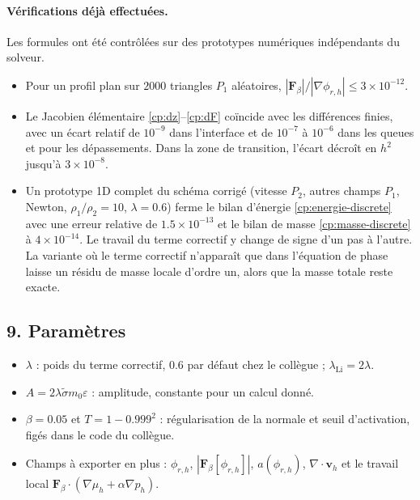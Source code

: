 \paragraph{Vérifications déjà effectuées.} Les formules ont été contrôlées sur des prototypes numériques indépendants du solveur.
\begin{itemize}
  \item Pour un profil plan sur $2000$ triangles $P_1$ aléatoires, $|\mathbf{F}_\beta|/|\nabla\phi_{r,h}|\le 3\times10^{-12}$.
  \item Le Jacobien élémentaire \eqref{cp:dz}--\eqref{cp:dF} coïncide avec les différences finies, avec un écart relatif de $10^{-9}$ dans l'interface et de $10^{-7}$ à $10^{-6}$ dans les queues et pour les dépassements. Dans la zone de transition, l'écart décroît en $h^{2}$ jusqu'à $3\times10^{-8}$.
  \item Un prototype 1D complet du schéma corrigé (vitesse $P_2$, autres champs $P_1$, Newton, $\rho_1/\rho_2=10$, $\lambda=0.6$) ferme le bilan d'énergie \eqref{cp:energie-discrete} avec une erreur relative de $1.5\times10^{-13}$ et le bilan de masse \eqref{cp:masse-discrete} à $4\times10^{-14}$. Le travail du terme correctif y change de signe d'un pas à l'autre. La variante où le terme correctif n'apparaît que dans l'équation de phase laisse un résidu de masse locale d'ordre un, alors que la masse totale reste exacte.
\end{itemize}

\subsection*{9. Paramètres}

\begin{itemize}
  \item $\lambda$ : poids du terme correctif, $0.6$ par défaut chez le collègue ; $\lambda_{\mathrm{Li}}=2\lambda$.
  \item $A = 2\lambda\tilde{\sigma}m_0\varepsilon$ : amplitude, constante pour un calcul donné.
  \item $\beta = 0.05$ et $T = 1-0.999^{2}$ : régularisation de la normale et seuil d'activation, figés dans le code du collègue.
  \item Champs à exporter en plus : $\phi_{r,h}$, $|\mathbf{F}_\beta[\phi_{r,h}]|$, $a(\phi_{r,h})$, $\nabla\cdot\mathbf{v}_h$ et le travail local $\mathbf{F}_\beta\cdot\left(\nabla\mu_h+\alpha\nabla p_h\right)$.
\end{itemize}

